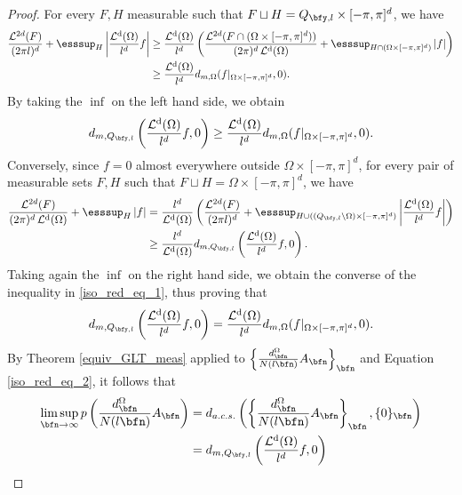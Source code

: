 \documentclass{amsart}
\DeclareMathOperator{\Ld}{\mathcal{L}^d}
\begin{document}
\begin{proof}
    For every $F,H$ measurable such that $F\sqcup H = Q_{\bfy,l}\times[-\pi,\pi]^d$, we have
    \begin{align*}
        \frac{\mathcal{L}^{2d}(F)}{(2\pi l)^d}+\esssup_{H}\left|\frac{\Ld(\Omega)}{l^d}f\right|&\geq \frac{\Ld(\Omega)}{l^d}\left( \frac{\mathcal{L}^{2d}(F\cap(\Omega\times[-\pi,\pi]^d))}{(2\pi )^d\Ld(\Omega)}+\esssup_{H\cap(\Omega\times[-\pi,\pi]^d)}\left|f\right|\right)\\
        &\geq \frac{\Ld(\Omega)}{l^d}d_{m,\Omega}(f|_{\Omega\times[-\pi,\pi]^d},0).
    \end{align*}
    By taking the $\inf$ on the left hand side, we obtain 
    \begin{equation}\label{iso_red_eq_1}
        d_{m,Q_{\bfy,l}}\left(\frac{\Ld(\Omega)}{l^d}f,0\right)\geq\frac{\Ld(\Omega)}{l^d}d_{m,\Omega}(f|_{\Omega\times[-\pi,\pi]^d},0).
    \end{equation}
    Conversely, since $f=0$ almost everywhere outside $\Omega\times[-\pi,\pi]^d$, for every pair of measurable sets $F,H$ such that $F\sqcup H=\Omega\times[-\pi,\pi]^d$, we have 
    \begin{align*}
        \frac{\mathcal{L}^{2d}(F)}{(2\pi)^d\Ld(\Omega)}+\esssup_{H}\left|f\right|&=\frac{l^d}{\Ld(\Omega)}\left(\frac{\mathcal{L}^{2d}(F)}{(2\pi l)^d}+\esssup_{H\cup ((Q_{\bfy,l}\setminus\Omega)\times[-\pi,\pi]^d)}\left|\frac{\Ld(\Omega)}{l^d}f\right|\right)\\
        &\geq \frac{l^d}{\Ld(\Omega)}d_{m,Q_{\bfy,l}}\left(\frac{\Ld(\Omega)}{l^d}f,0\right).
    \end{align*}
    Taking again the $\inf$ on the right hand side, we obtain the converse of the inequality in \eqref{iso_red_eq_1}, thus proving that 
    \begin{equation}\label{iso_red_eq_2}
        d_{m,Q_{\bfy,l}}\left(\frac{\Ld(\Omega)}{l^d}f,0\right)=\frac{\Ld(\Omega)}{l^d}d_{m,\Omega}(f|_{\Omega\times[-\pi,\pi]^d},0).
    \end{equation}
    By Theorem \ref{equiv_GLT_meas} applied to $\left\{\frac{d_\bfn^{\Omega}}{N(l\bfn)}A_\bfn\right\}_\bfn$ and Equation \eqref{iso_red_eq_2}, it follows that 
    \begin{align}\label{iso_red_eq_3}
        \limsup\limits_{\bfn\to\infty}p\left(\frac{d_\bfn^{\Omega}}{N(l\bfn)}A_\bfn\right)&=d_{a.c.s.}\left(\left\{\frac{d_\bfn^{\Omega}}{N(l\bfn)}A_\bfn\right\}_\bfn,\{0\}_\bfn\right)\\
        \nonumber&=d_{m,Q_{\bfy,l}}\left(\frac{\Ld(\Omega)}{l^d}f,0\right)\\

\end{align}
\end{proof}
\end{document}
